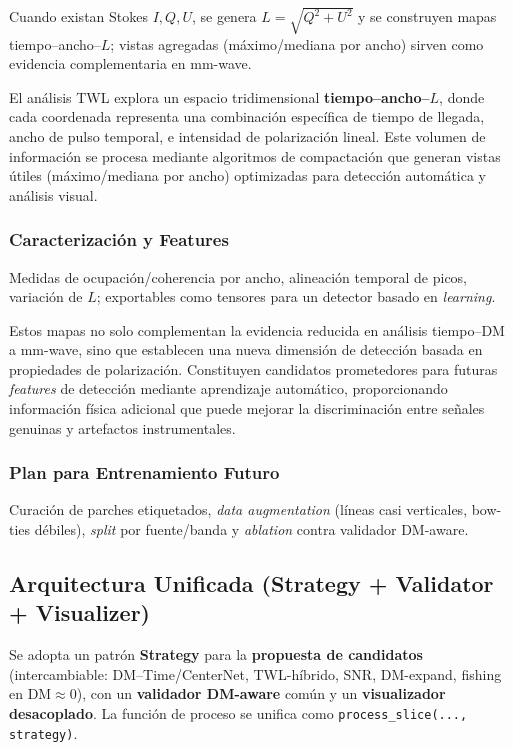 Cuando existan Stokes $I,Q,U$, se genera $L=\sqrt{Q^2+U^2}$ y se construyen mapas tiempo--ancho--$L$; vistas agregadas (máximo/mediana por ancho) sirven como evidencia complementaria en mm-wave.

El análisis TWL explora un espacio tridimensional \textbf{tiempo--ancho--$L$}, donde cada coordenada representa una combinación específica de tiempo de llegada, ancho de pulso temporal, e intensidad de polarización lineal. Este volumen de información se procesa mediante algoritmos de compactación que generan vistas útiles (máximo/mediana por ancho) optimizadas para detección automática y análisis visual.

\subsubsection{Caracterización y Features}

Medidas de ocupación/coherencia por ancho, alineación temporal de picos, variación de $L$; exportables como tensores para un detector basado en \textit{learning}.

Estos mapas no solo complementan la evidencia reducida en análisis tiempo--DM a mm-wave, sino que establecen una nueva dimensión de detección basada en propiedades de polarización. Constituyen candidatos prometedores para futuras \emph{features} de detección mediante aprendizaje automático, proporcionando información física adicional que puede mejorar la discriminación entre señales genuinas y artefactos instrumentales.

\subsubsection{Plan para Entrenamiento Futuro}

Curación de parches etiquetados, \emph{data augmentation} (líneas casi verticales, bow-ties débiles), \emph{split} por fuente/banda y \emph{ablation} contra validador DM-aware.

\subsection{Arquitectura Unificada (Strategy + Validator + Visualizer)}

Se adopta un patrón \textbf{Strategy} para la \textbf{propuesta de candidatos} (intercambiable: DM--Time/CenterNet, TWL-híbrido, SNR, DM-expand, fishing en DM$\approx0$), con un \textbf{validador DM-aware} común y un \textbf{visualizador desacoplado}. La función de proceso se unifica como \texttt{process\_slice(..., strategy)}.

